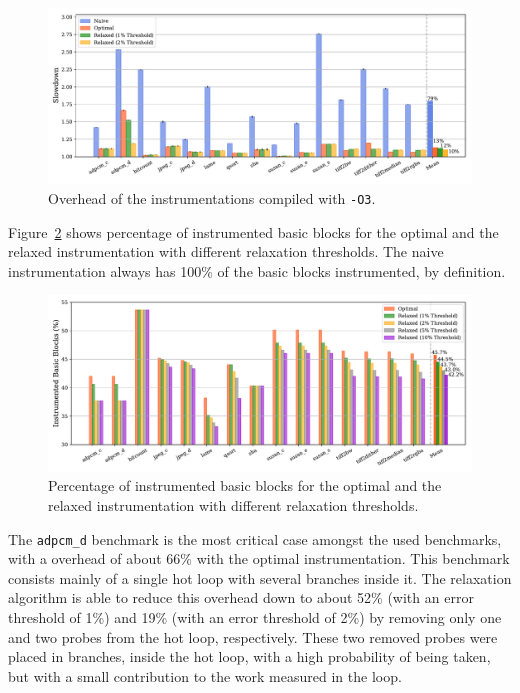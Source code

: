 \documentclass[sigplan,9pt]{acmart}
\begin{document}
\begin{figure}[htp]
    \centering
    \includegraphics[width=\textwidth]{figs/overhead-O3.pdf}
    \caption{Overhead of the instrumentations compiled with {\texttt{-O3}}.}
    \label{fig:overhead-O3}
\end{figure}

Figure~\ref{fig:instr} shows percentage of instrumented basic blocks
for the optimal and the relaxed instrumentation with different relaxation
thresholds. The naive instrumentation always has 100\% of the basic blocks
instrumented, by definition.

\begin{figure}[htp]
    \centering
    \includegraphics[width=\textwidth]{figs/instr.pdf}
    \caption{Percentage of instrumented basic blocks
for the optimal and the relaxed instrumentation with different relaxation
thresholds.}
    \label{fig:instr}
\end{figure}

The \texttt{adpcm\_d} benchmark is the most critical case amongst the
used benchmarks, with a overhead of about 66\% with the optimal instrumentation.
This benchmark consists mainly of a single hot loop with several branches
inside it.
The relaxation algorithm is able to reduce this overhead down to about 52\%
(with an error threshold of 1\%) and 19\% (with an error threshold of 2\%)
by removing only one and two probes from the hot loop, respectively.
These two removed probes were placed in branches, inside the hot loop, with
a high probability of being taken, but with a small contribution to the work
measured in the loop.
\end{document}
